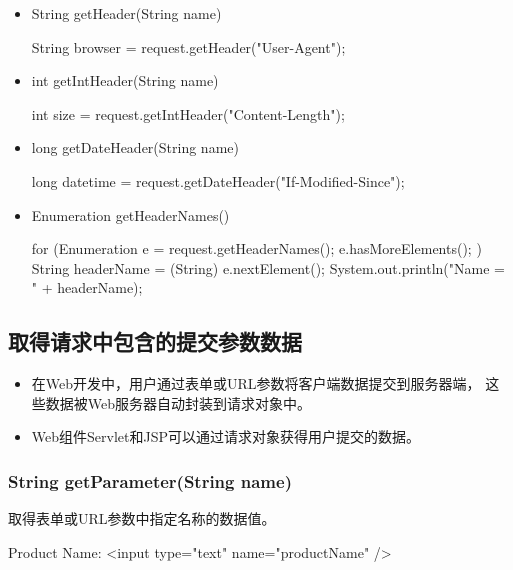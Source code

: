 \begin{itemize}
\item String getHeader(String name)
  \begin{javaCode}
    String browser = request.getHeader("User-Agent");
  \end{javaCode}

\item int getIntHeader(String name)
  \begin{javaCode}
    int size = request.getIntHeader("Content-Length");
  \end{javaCode}

\item long getDateHeader(String name)
  \begin{javaCode}
    long datetime = request.getDateHeader("If-Modified-Since");
  \end{javaCode}

\item Enumeration getHeaderNames()
  
  \begin{javaCode}
    for (Enumeration e = request.getHeaderNames(); e.hasMoreElements(); ) {
      String headerName = (String) e.nextElement();
      System.out.println("Name = " + headerName);
    }
  \end{javaCode}
\end{itemize}

\subsection{取得请求中包含的提交参数数据} 

\begin{itemize}
\item 在Web开发中，用户通过表单或URL参数将客户端数据提交到服务器端，
  这些数据被Web服务器自动封装到请求对象中。
\item Web组件Servlet和JSP可以通过请求对象获得用户提交的数据。
\end{itemize}
  
\subsubsection{String getParameter(String name)}

取得表单或URL参数中指定名称的数据值。


\begin{xmlCode}
  Product Name: <input type="text" name="productName" />
\end{xmlCode}

